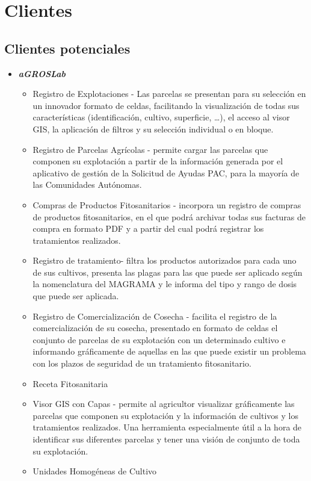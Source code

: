 \chapter{Clientes}
\section{Clientes potenciales}
\begin{itemize}
\item \textbf{\textit{aGROSLab}} \cite{agroslab}
\begin{itemize}
\item Registro de Explotaciones - Las parcelas se presentan para su selección en un innovador formato de celdas, facilitando la visualización de todas sus características (identificación, cultivo, superficie, …), el acceso al visor GIS, la aplicación de filtros y su selección individual o en bloque.
\item Registro de Parcelas Agrícolas - permite cargar las parcelas que componen su explotación a partir de la información generada por el aplicativo de gestión de la Solicitud de Ayudas PAC, para la mayoría de las Comunidades Autónomas.
\item Compras de Productos Fitosanitarios - incorpora un registro de compras de productos fitosanitarios, en el que podrá archivar todas sus facturas de compra en formato PDF y a partir del cual podrá registrar los tratamientos realizados.
\item Registro de \gls{tratamiento}- filtra los productos autorizados para cada uno de sus cultivos, presenta las plagas para las que puede ser aplicado según la nomenclatura del MAGRAMA y le informa del tipo y rango de dosis que puede ser aplicada.
\item Registro de Comercialización de Cosecha - facilita el registro de la comercialización de su cosecha, presentado en formato de celdas el conjunto de parcelas de su explotación con un determinado cultivo e informando gráficamente de aquellas en las que puede existir un problema con los plazos de seguridad de un tratamiento fitosanitario.
\item Receta Fitosanitaria 
\item Visor GIS con Capas - permite al agricultor visualizar gráficamente las parcelas que componen su explotación y la información de cultivos y los tratamientos realizados. Una herramienta especialmente útil a la hora de identificar sus diferentes parcelas y tener una visión de conjunto de toda su explotación.
\item Unidades Homogéneas de Cultivo

\end{itemize}
\end{itemize}
